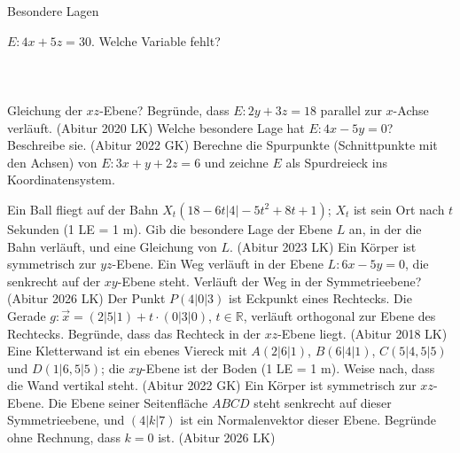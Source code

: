 \setcounter{aufgabe}{14}

\begin{aufgabe}{Besondere Lagen}
\begin{teile}
\teil $E\colon 4x + 5z = 30$. Welche Variable fehlt? \\  \\  \\  \\ 
\teil Gleichung der $xz$-Ebene?
\teil Begründe, dass $E\colon 2y + 3z = 18$ parallel zur $x$-Achse verläuft. \hfill (Abitur 2020 LK)
\teil Welche besondere Lage hat $E\colon 4x - 5y = 0$? Beschreibe sie. \hfill (Abitur 2022 GK)
\teil Berechne die Spurpunkte (Schnittpunkte mit den Achsen) von $E\colon 3x + y + 2z = 6$ und zeichne $E$ als Spurdreieck ins Koordinatensystem.

\begin{ksys3}[xyz]\end{ksys3}
\teil Ein Ball fliegt auf der Bahn $X_t(18 - 6t | 4 | -5t^2 + 8t + 1)$; $X_t$ ist sein Ort nach $t$ Sekunden (1 LE = 1 m). Gib die besondere Lage der Ebene $L$ an, in der die Bahn verläuft, und eine Gleichung von $L$. \hfill (Abitur 2023 LK)
\teil Ein Körper ist symmetrisch zur $yz$-Ebene. Ein Weg verläuft in der Ebene $L\colon 6x - 5y = 0$, die senkrecht auf der $xy$-Ebene steht. Verläuft der Weg in der Symmetrieebene? \hfill (Abitur 2026 LK)
\teil Der Punkt $P(4 | 0 | 3)$ ist Eckpunkt eines Rechtecks. Die Gerade $g\colon \vec x = (2 | 5 | 1) + t \cdot (0 | 3 | 0)$, $t \in \mathbb{R}$, verläuft orthogonal zur Ebene des Rechtecks. Begründe, dass das Rechteck in der $xz$-Ebene liegt. \hfill (Abitur 2018 LK)
\teil Eine Kletterwand ist ein ebenes Viereck mit $A(2 | 6 | 1)$, $B(6 | 4 | 1)$, $C(5 | 4{,}5 | 5)$ und $D(1 | 6{,}5 | 5)$; die $xy$-Ebene ist der Boden (1 LE = 1 m). Weise nach, dass die Wand vertikal steht. \hfill (Abitur 2022 GK)
\teil Ein Körper ist symmetrisch zur $xz$-Ebene. Die Ebene seiner Seitenfläche $ABCD$ steht senkrecht auf dieser Symmetrieebene, und $(4 | k | 7)$ ist ein Normalenvektor dieser Ebene. Begründe ohne Rechnung, dass $k = 0$ ist. \hfill (Abitur 2026 LK)
\end{teile}
\end{aufgabe}

